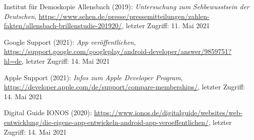 \documentclass[11pt,a4paper]{article}
\begin{document}
\begin{itemize}
     Institut für Demoskopie Allensbach (2019): \textit{Untersuchung zum Sehbewusstsein der Deutschen},  \url{https://www.sehen.de/presse/pressemitteilungen/zahlen-fakten/allensbach-brillenstudie-201920/}, letzter Zugriff: 11. Mai 2021

     Google Support (2021): \textit{App veröffentlichen}, \url{https://support.google.com/googleplay/android-developer/answer/9859751?hl=de}, letzter Zugriff: 14. Mai 2021

     Apple Support (2021): \textit{Infos zum Apple Developer Program}, \url{https://developer.apple.com/de/support/compare-memberships/}, letzter Zugriff: 14. Mai 2021
    
     Digital Guide IONOS (2020): \url{https://www.ionos.de/digitalguide/websites/web-entwicklung/die-eigene-app-entwickeln-android-app-veroeffentlichen/}, letzter Zugriff: 14. Mai 2021
\end{itemize}
\end{document}
